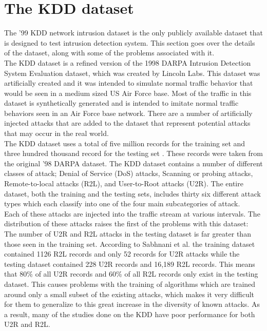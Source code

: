 \documentclass[12pt]{article} %
\begin{document}
\section{The KDD dataset}
The '99 KDD network intrusion dataset is the only publicly available dataset that is designed to test intrusion detection system. This section goes over the details of the dataset, along with some of the problems associated with it.\\
The KDD dataset is a refined version of the 1998 DARPA Intrusion Detection System Evaluation dataset, which was created by Lincoln Labs. This dataset was artificially created and it was intended to simulate normal traffic behavior that would be seen in a medium sized US Air Force base\cite{mukkamala02}. Most of the traffic in this dataset is synthetically generated and is intended to imitate normal traffic behaviors seen in an Air Force base network. There are a number of artificially injected attacks that are added to the dataset that represent potential attacks that may occur in the real world.\\
The KDD dataset uses a total of five million records for the training set and three hundred thousand record for the testing set \cite{sabhnani04}. These records were taken from the original '98 DARPA dataset. The KDD dataset contains a number of different classes of attack; Denial of Service (DoS) attacks, Scanning or probing attacks, Remote-to-local attacks (R2L), and User-to-Root attacks (U2R). The entire dataset, both the training and the testing sets, includes thirty six different attack types which each classify into one of the four main subcategories of attack. \\
 Each of these attacks are injected into the traffic stream at various intervals. The distribution of these attacks raises the first of the problems with this dataset: The number of U2R and R2L attacks in the testing dataset is far greater than those seen in the training set. According to Sabhnani et al. the training dataset contained 1126 R2L records and only 52 records for U2R attacks while the testing dataset contained 228 U2R records and 16,189 R2L records\cite{sabhnani04}. This means that 80\% of all U2R records and 60\% of all R2L records only exist in the testing dataset. This causes problems with the training of algorithms which are trained around only a small subset of the existing attacks, which makes it very difficult for them to generalize to this great increase in the diversity of known attacks. As a result, many of the studies done on the KDD have poor performance for both U2R and R2L.\\
\end{document}
